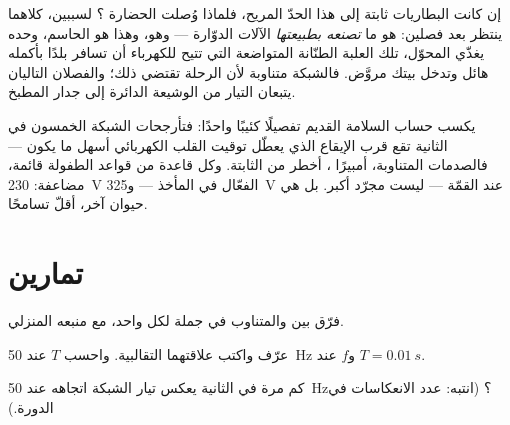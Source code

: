 \begin{remark}\label{rem:g9:alternating-current:why}
إن كانت البطاريات ثابتة إلى هذا الحدّ المريح، فلماذا وُصلت
الحضارة ؟ لسببين، كلاهما ينتظر بعد فصلين:
 هو ما \emph{تصنعه بطبيعتها} الآلات الدوّارة
--- وهو، وهذا هو الحاسم، وحده يغذّي المحوّل، تلك العلبة
الطنّانة المتواضعة التي تتيح للكهرباء أن تسافر بلدًا بأكمله
 هائل وتدخل بيتك  مروَّض. فالشبكة متناوبة لأن الرحلة
تقتضي ذلك؛ والفصلان التاليان يتبعان التيار من الوشيعة الدائرة
إلى جدار المطبخ.
\end{remark}

\begin{remark}\label{rem:g9:alternating-current:safety}
يكسب حساب السلامة القديم تفصيلًا كئيبًا واحدًا: فتأرجحات
الشبكة الخمسون في الثانية تقع قرب الإيقاع الذي يعطّل توقيت
القلب الكهربائي أسهل ما يكون --- فالصدمات المتناوبة، أمبيرًا
، أخطر من الثابتة. وكل قاعدة من قواعد الطفولة قائمة،
مضاعفة:  \qty{230}{V} الفعّال في المأخذ --- و\qty{325}{V}
عند القمّة --- ليست مجرّد  أكبر. بل هي حيوان آخر، أقلّ
تسامحًا.
\end{remark}

\section{تمارين}

\begin{exercise}[$\star$]\label{exo:g9:alternating-current:1}
فرّق بين  والمتناوب في جملة لكل واحد، مع منبعه
المنزلي.
\end{exercise}

\begin{exercise}[$\star$]\label{exo:g9:alternating-current:2}
عرّف   واكتب علاقتهما التقالبية. واحسب $T$ عند
\qty{50}{Hz} و$f$ عند $T = \qty{0.01}{s}$.
\end{exercise}

\begin{exercise}[$\star$]\label{exo:g9:alternating-current:3}
كم مرة في الثانية يعكس تيار الشبكة اتجاهه عند \qty{50}{Hz}؟
(انتبه: عدد الانعكاسات في الدورة.)
\end{exercise}

